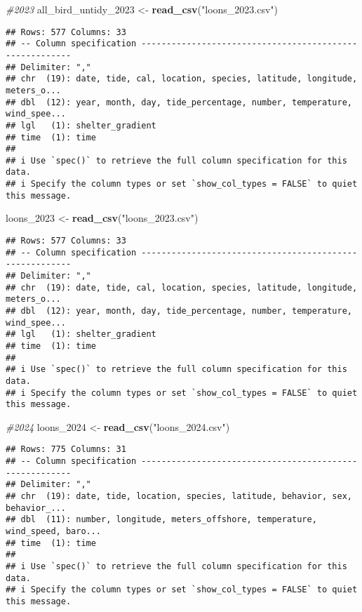 \documentclass[
]{article}
\newenvironment{Shaded}{\begin{snugshade}}{\end{snugshade}}
\newcommand{\CommentTok}[1]{\textcolor[rgb]{0.56,0.35,0.01}{\textit{#1}}}
\newcommand{\FunctionTok}[1]{\textcolor[rgb]{0.13,0.29,0.53}{\textbf{#1}}}
\newcommand{\NormalTok}[1]{#1}
\newcommand{\OtherTok}[1]{\textcolor[rgb]{0.56,0.35,0.01}{#1}}
\newcommand{\StringTok}[1]{\textcolor[rgb]{0.31,0.60,0.02}{#1}}
\begin{document}
\begin{Shaded}
\begin{Highlighting}[]
\CommentTok{\#2023}
\NormalTok{all\_bird\_untidy\_2023 }\OtherTok{\textless{}{-}} \FunctionTok{read\_csv}\NormalTok{(}\StringTok{"loons\_2023.csv"}\NormalTok{)}
\end{Highlighting}
\end{Shaded}

\begin{verbatim}
## Rows: 577 Columns: 33
## -- Column specification --------------------------------------------------------
## Delimiter: ","
## chr  (19): date, tide, cal, location, species, latitude, longitude, meters_o...
## dbl  (12): year, month, day, tide_percentage, number, temperature, wind_spee...
## lgl   (1): shelter_gradient
## time  (1): time
## 
## i Use `spec()` to retrieve the full column specification for this data.
## i Specify the column types or set `show_col_types = FALSE` to quiet this message.
\end{verbatim}

\begin{Shaded}
\begin{Highlighting}[]
\NormalTok{loons\_2023 }\OtherTok{\textless{}{-}} \FunctionTok{read\_csv}\NormalTok{(}\StringTok{"loons\_2023.csv"}\NormalTok{)}
\end{Highlighting}
\end{Shaded}

\begin{verbatim}
## Rows: 577 Columns: 33
## -- Column specification --------------------------------------------------------
## Delimiter: ","
## chr  (19): date, tide, cal, location, species, latitude, longitude, meters_o...
## dbl  (12): year, month, day, tide_percentage, number, temperature, wind_spee...
## lgl   (1): shelter_gradient
## time  (1): time
## 
## i Use `spec()` to retrieve the full column specification for this data.
## i Specify the column types or set `show_col_types = FALSE` to quiet this message.
\end{verbatim}

\begin{Shaded}
\begin{Highlighting}[]
\CommentTok{\#2024}
\NormalTok{loons\_2024 }\OtherTok{\textless{}{-}} \FunctionTok{read\_csv}\NormalTok{(}\StringTok{"loons\_2024.csv"}\NormalTok{)}
\end{Highlighting}
\end{Shaded}

\begin{verbatim}
## Rows: 775 Columns: 31
## -- Column specification --------------------------------------------------------
## Delimiter: ","
## chr  (19): date, tide, location, species, latitude, behavior, sex, behavior_...
## dbl  (11): number, longitude, meters_offshore, temperature, wind_speed, baro...
## time  (1): time
## 
## i Use `spec()` to retrieve the full column specification for this data.
## i Specify the column types or set `show_col_types = FALSE` to quiet this message.
\end{verbatim}
\end{document}
